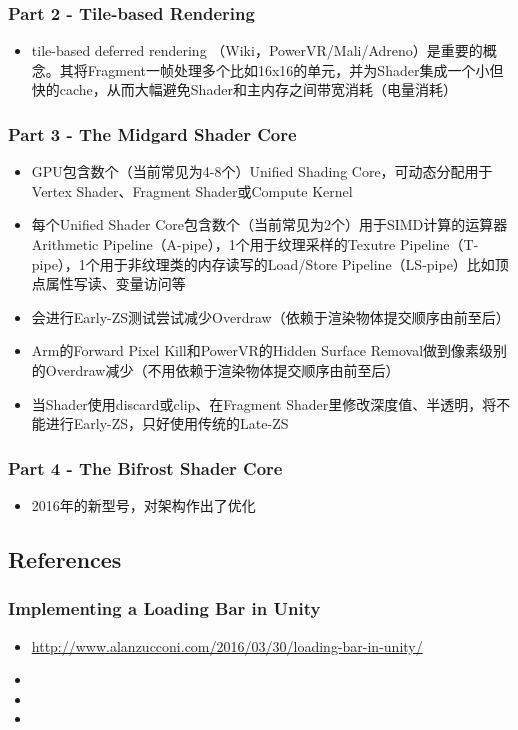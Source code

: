\documentclass[9pt, b5paper]{article}
\begin{document}
\subsubsection{Part 2 - Tile-based Rendering}
\label{sec:org397b6b9}
\begin{itemize}
\item tile-based deferred rendering （Wiki，PowerVR/Mali/Adreno）是重要的概念。其将Fragment一帧处理多个比如16x16的单元，并为Shader集成一个小但快的cache，从而大幅避免Shader和主内存之间带宽消耗（电量消耗）
\end{itemize}
\subsubsection{Part 3 - The Midgard Shader Core}
\label{sec:org54a524c}
\begin{itemize}
\item GPU包含数个（当前常见为4-8个）Unified Shading Core，可动态分配用于Vertex Shader、Fragment Shader或Compute Kernel
\item 每个Unified Shader Core包含数个（当前常见为2个）用于SIMD计算的运算器Arithmetic Pipeline（A-pipe），1个用于纹理采样的Texutre Pipeline（T-pipe），1个用于非纹理类的内存读写的Load/Store Pipeline（LS-pipe）比如顶点属性写读、变量访问等
\item 会进行Early-ZS测试尝试减少Overdraw（依赖于渲染物体提交顺序由前至后）
\item Arm的Forward Pixel Kill和PowerVR的Hidden Surface Removal做到像素级别的Overdraw减少（不用依赖于渲染物体提交顺序由前至后）
\item 当Shader使用discard或clip、在Fragment Shader里修改深度值、半透明，将不能进行Early-ZS，只好使用传统的Late-ZS
\end{itemize}
\subsubsection{Part 4 - The Bifrost Shader Core}
\label{sec:orga529b6c}
\begin{itemize}
\item 2016年的新型号，对架构作出了优化
\end{itemize}

\subsection{References}
\label{sec:org8fbc822}
\subsubsection{Implementing a Loading Bar in Unity}
\label{sec:org30176da}
\begin{itemize}
\item \url{http://www.alanzucconi.com/2016/03/30/loading-bar-in-unity/}
\item 

\item 

\item 
\end{itemize}
\end{document}
